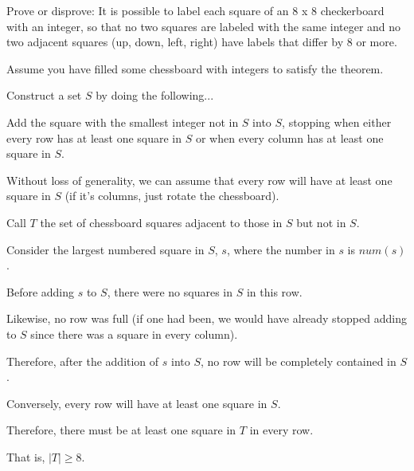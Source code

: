 \documentclass[11pt]{article}
\begin{document}
\begin{problems}


  \newpage

  \problem

  \begin{theorem}
      Prove or disprove: It is possible to label each square of an 8 x 8 checkerboard with an integer, 
      so that no two squares are labeled with the same integer and no two adjacent squares 
      (up, down, left, right) have labels that differ by 8 or more.
  \end{theorem}

  \smallskip

  \begin{longFormProof}

    \begin{block}[A]
      {Assume you have filled some chessboard with integers to satisfy the theorem.}

      \step Construct a set $S$ by doing the following...

      \step Add the square with the smallest integer not in $S$ into $S$, 
            stopping when either every row has at least one square in $S$ or when every column has at least one square in $S$.

      \step Without loss of generality, we can assume that every row will have at least one square in $S$ (if it's columns, just rotate the chessboard).

      \step Call $T$ the set of chessboard squares adjacent to those in $S$ but not in $S$.

      \step Consider the largest numbered square in $S$, $s$, where the number in $s$ is $num(s)$.

      \step Before adding $s$ to $S$, there were no squares in $S$ in this row.

      \step Likewise, no row was full (if one had been, we would have already stopped adding to $S$ since there was a square in every column).

      \step Therefore, after the addition of $s$ into $S$, no row will be completely contained in $S$.

      \step Conversely, every row will have at least one square in $S$.

      \step Therefore, there must be at least one square in $T$ in every row.

      \step That is, $|T| \geq 8$.




\end{block}
\end{longFormProof}
\end{problems}
\end{document}
